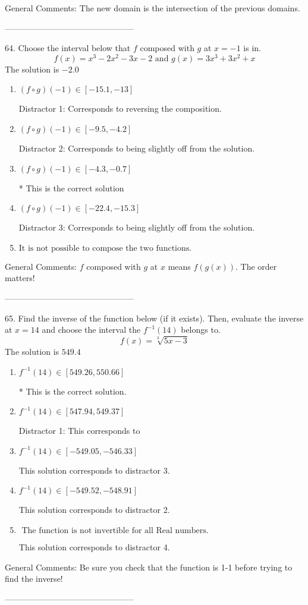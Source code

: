 \documentclass{article}[14pt]
\begin{document}
General Comments: The new domain is the intersection of the previous domains.

-----------------------------------------------

64. Choose the interval below that $f$ composed with $g$ at $x=-1$ is in.
$$ f(x) = x^{3} -2 x^{2} -3 x -2 \text{ and } g(x) = 3x^{3} +3 x^{2} +x $$ 
The solution is $ -2.0 $ 

\begin{enumerate}[label=\Alph*.] 
\item $ (f \circ g)(-1) \in [-15.1, -13] $ 

  Distractor 1: Corresponds to reversing the composition. 
\item $ (f \circ g)(-1) \in [-9.5, -4.2] $ 

  Distractor 2: Corresponds to being slightly off from the solution. 
\item $ (f \circ g)(-1) \in [-4.3, -0.7] $ 

 * This is the correct solution 
\item $ (f \circ g)(-1) \in [-22.4, -15.3] $ 

  Distractor 3: Corresponds to being slightly off from the solution. 
\item $ \text{It is not possible to compose the two functions.} $ 

  
\end{enumerate} 
 
General Comments: $f$ composed with $g$ at $x$ means $f(g(x))$. The order matters!

-----------------------------------------------

65. Find the inverse of the function below (if it exists). Then, evaluate the inverse at $x = 14$ and choose the interval the $f^{-1}(14)$ belongs to.
$$ f(x) = \sqrt[3]{5 x - 3} $$ 
The solution is $ 549.4 $ 

\begin{enumerate}[label=\Alph*.] 
\item $ f^{-1}(14) \in [549.26, 550.66] $ 

 * This is the correct solution. 
\item $ f^{-1}(14) \in [547.94, 549.37] $ 

  Distractor 1: This corresponds to  
\item $ f^{-1}(14) \in [-549.05, -546.33] $ 

  This solution corresponds to distractor 3. 
\item $ f^{-1}(14) \in [-549.52, -548.91] $ 

  This solution corresponds to distractor 2. 
\item $ \text{ The function is not invertible for all Real numbers. } $ 

  This solution corresponds to distractor 4. 
\end{enumerate} 
 
General Comments: Be sure you check that the function is 1-1 before trying to find the inverse!

-----------------------------------------------
\end{document}
